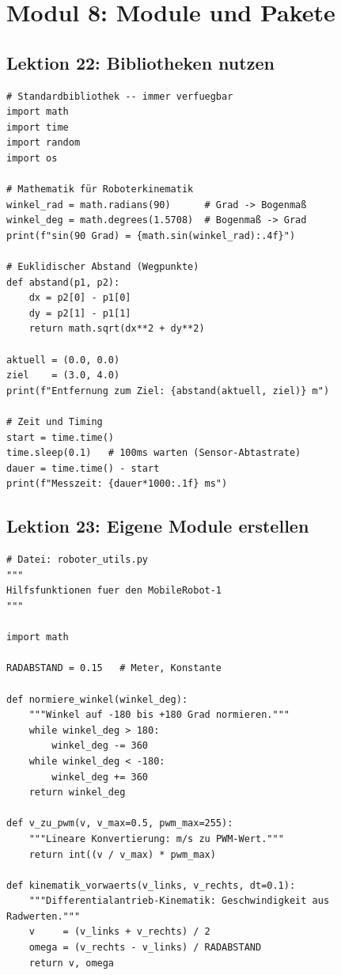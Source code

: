 \chapter{Modul 8: Module und Pakete}

\section{Lektion 22: Bibliotheken nutzen}

\begin{lstlisting}
# Standardbibliothek -- immer verfuegbar
import math
import time
import random
import os

# Mathematik für Roboterkinematik
winkel_rad = math.radians(90)      # Grad -> Bogenmaß
winkel_deg = math.degrees(1.5708)  # Bogenmaß -> Grad
print(f"sin(90 Grad) = {math.sin(winkel_rad):.4f}")

# Euklidischer Abstand (Wegpunkte)
def abstand(p1, p2):
    dx = p2[0] - p1[0]
    dy = p2[1] - p1[1]
    return math.sqrt(dx**2 + dy**2)

aktuell = (0.0, 0.0)
ziel    = (3.0, 4.0)
print(f"Entfernung zum Ziel: {abstand(aktuell, ziel)} m")

# Zeit und Timing
start = time.time()
time.sleep(0.1)   # 100ms warten (Sensor-Abtastrate)
dauer = time.time() - start
print(f"Messzeit: {dauer*1000:.1f} ms")
\end{lstlisting}

\section{Lektion 23: Eigene Module erstellen}

\begin{lstlisting}
# Datei: roboter_utils.py
"""
Hilfsfunktionen fuer den MobileRobot-1
"""

import math

RADABSTAND = 0.15   # Meter, Konstante

def normiere_winkel(winkel_deg):
    """Winkel auf -180 bis +180 Grad normieren."""
    while winkel_deg > 180:
        winkel_deg -= 360
    while winkel_deg < -180:
        winkel_deg += 360
    return winkel_deg

def v_zu_pwm(v, v_max=0.5, pwm_max=255):
    """Lineare Konvertierung: m/s zu PWM-Wert."""
    return int((v / v_max) * pwm_max)

def kinematik_vorwaerts(v_links, v_rechts, dt=0.1):
    """Differentialantrieb-Kinematik: Geschwindigkeit aus Radwerten."""
    v     = (v_links + v_rechts) / 2
    omega = (v_rechts - v_links) / RADABSTAND
    return v, omega
\end{lstlisting}

